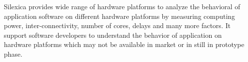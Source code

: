 \par Silexica provides wide range of hardware platforms to analyze the behavioral of application software on different hardware platforms by measuring computing power, inter-connectivity, number of cores, delays and many more factors. It support software developers to understand the behavior of application on hardware platforms which may not be available in market or in still in prototype phase. 